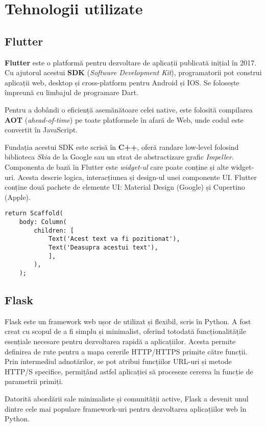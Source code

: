 \chapter{Tehnologii utilizate}

\section{Flutter}

\textbf{Flutter} este o platformă pentru dezvoltare de aplicații publicată inițial în 2017. Cu ajutorul acestui \textbf{SDK} (\emph{Software Development Kit}), programatorii pot construi aplicații web, desktop și cross-platform pentru Android și IOS. Se folosește împreună cu limbajul de programare Dart.

Pentru a dobândi o eficiență asemănătoare celei native, este folosită compilarea \textbf{AOT} (\emph{ahead-of-time}) pe toate platformele în afară de Web, unde codul este convertit în JavaScript.

Fundația acestui SDK este scrisă în \textbf{C++}, oferă randare low-level folosind biblioteca \emph{Skia} de la Google sau un strat de abstractizare grafic \emph{Impeller}. Componenta de bază în Flutter este \emph{widget-ul} care poate conține și alte widget-uri. Acesta descrie logica, interacțiunea și design-ul unei componente UI. Flutter conține două pachete de elemente UI: Material Design (Google) și Cupertino (Apple).
\begin{lstlisting}[style=python, caption=Widget Scaffold]
return Scaffold(
	body: Column(
		children: [
			Text('Acest text va fi pozitionat'),
			Text('Deasupra acestui text'),
			],
		),
	);
\end{lstlisting}

\section{Flask}

Flask este un framework web ușor de utilizat și flexibil, scris în Python. A fost creat cu scopul de a fi simplu și minimalist, oferind totodată funcționalitățile esențiale necesare pentru dezvoltarea rapidă a aplicațiilor. Acesta permite definirea de rute pentru a mapa cererile HTTP/HTTPS primite către funcții. Prin intermediul adnotărilor, se pot atribui funcțiilor URL-uri și metode HTTP/S specifice, permițând astfel aplicației să proceseze cererea în funcție de parametrii primiți.

Datorită abordării sale minimaliste și comunității active, Flask a devenit unul dintre cele mai populare framework-uri pentru dezvoltarea aplicațiilor web în Python.

